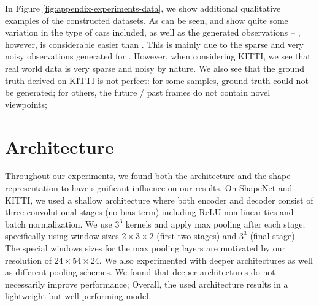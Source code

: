 \documentclass[10pt,letterpaper]{article}
\begin{document}
%
In Figure \ref{fig:appendix-experiments-data}, we show additional qualitative examples of the constructed datasets. As can be seen, \clean and \noisy show quite some variation in the type of cars included, as well as the generated observations -- \clean, however, is considerable easier than \noisy. This is mainly due to the sparse and very noisy observations generated for \noisy. However, when considering KITTI, we see that real world data is very sparse and noisy by nature. We also see that the ground truth derived on KITTI is not perfect: for some samples, ground truth could not be generated; for others, the future / past frames do not contain novel viewpoints; 

\section{Architecture}
\label{sec:appendix-architecture}

Throughout our experiments, we found both the architecture and the shape representation to have significant influence on our results. On ShapeNet and KITTI, we used a shallow architecture where both encoder and decoder consist of three convolutional stages (no bias term) including $\text{ReLU}$ non-linearities and batch normalization. We use $3^3$ kernels and apply max pooling after each stage; specifically using window sizes $2\times 3 \times 2$ (first two stages) and $3^3$ (final stage). The special windows sizes for the max pooling layers are motivated by our resolution of $24 \times 54 \times 24$.  We also experimented with deeper architectures as well as different pooling schemes. We found that deeper architectures do not necessarily improve performance; 
Overall, the used architecture results in a lightweight but well-performing model.
\end{document}
